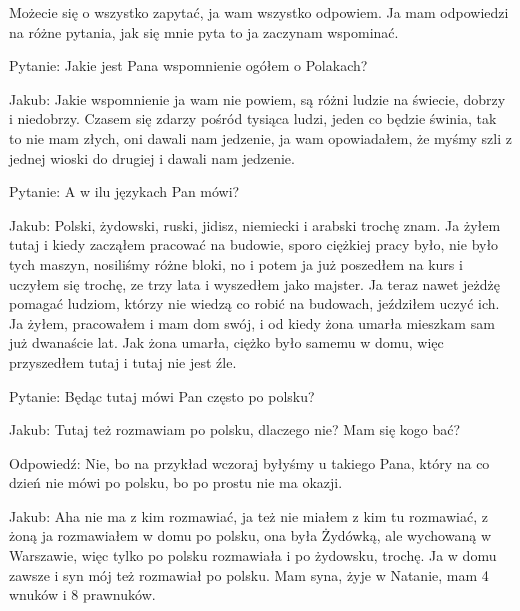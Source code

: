  Możecie się o wszystko zapytać, ja wam wszystko odpowiem. Ja mam odpowiedzi na różne pytania, jak się mnie pyta to ja zaczynam wspominać. 

Pytanie: Jakie jest Pana wspomnienie ogółem o Polakach? 

Jakub: Jakie wspomnienie ja wam nie powiem, są różni ludzie na świecie, dobrzy i niedobrzy. Czasem się zdarzy pośród tysiąca ludzi, jeden co będzie świnia, tak to nie mam złych, oni dawali nam jedzenie, ja wam opowiadałem, że myśmy szli z jednej wioski do drugiej i dawali nam jedzenie. 

Pytanie: A w ilu językach Pan mówi? 

Jakub: Polski, żydowski, ruski, jidisz, niemiecki i arabski trochę znam. Ja żyłem tutaj i kiedy zacząłem pracować na budowie, sporo ciężkiej pracy było, nie było tych maszyn, nosiliśmy różne bloki, no          i potem ja już poszedłem na kurs i uczyłem się trochę, ze trzy lata i wyszedłem jako majster. Ja teraz nawet jeżdżę pomagać ludziom, którzy nie wiedzą co robić na budowach, jeździłem uczyć ich. Ja żyłem, pracowałem i mam dom swój, i od kiedy żona umarła mieszkam sam już dwanaście lat. Jak żona umarła, ciężko było samemu w domu, więc przyszedłem tutaj i tutaj nie jest źle.  

Pytanie: Będąc tutaj mówi Pan często po polsku? 

Jakub: Tutaj też rozmawiam po polsku, dlaczego nie? Mam się kogo bać? 

Odpowiedź: Nie, bo na przykład wczoraj byłyśmy u takiego Pana, który na co dzień nie mówi po polsku, bo po prostu nie ma okazji. 

Jakub: Aha nie ma z kim rozmawiać, ja też nie miałem z kim tu rozmawiać, z żoną ja rozmawiałem w domu po polsku, ona była Żydówką, ale wychowaną  w Warszawie, więc tylko po polsku rozmawiała i po żydowsku, trochę. Ja w domu zawsze i syn mój też rozmawiał po polsku. Mam syna, żyje w Natanie, mam 4 wnuków i 8 prawnuków.  